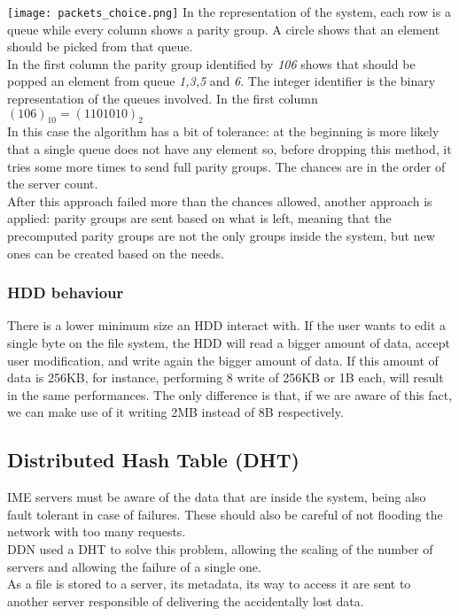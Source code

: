 \texttt{[image: packets\_choice.png]}
In the representation of the system, each row is a queue while every column shows a parity group.
A circle shows that an element should be picked from that queue. \\
In the first column the parity group identified by \textit{106} shows that
should be popped an element from queue \textit{1,3,5} and \textit{6}. The
integer identifier is the binary representation of the queues involved. In the
first column $(106)_{10} = (1101010)_2$ \\
In this case the algorithm has a bit of tolerance: at the beginning is more
likely that a single queue does not have any element so, before dropping this
method, it tries some more times to send full parity groups. The chances are in
the order of the server count. \\
After this approach failed more than the chances allowed, another approach is applied:
parity groups are sent based on what is left, meaning that the precomputed
parity groups are not the only groups inside the system, but new ones can be
created based on the needs.\\

\subsubsection*{HDD behaviour}\label{hdd-behaviour}
There is a lower minimum size an HDD interact with. If the user wants to edit a
single byte on the file system, the HDD will read a bigger amount of data,
accept user modification, and write again the bigger amount of data. If this
amount of data is 256KB, for instance, performing 8 write of 256KB or 1B each,
will result in the same performances.  The only difference is that, if we are
aware of this fact, we can make use of it writing 2MB instead of 8B
respectively.

\subsection{Distributed Hash Table (DHT)}
IME servers must be aware of the data that are inside the system, being also
fault tolerant in case of failures. These should also be careful of not flooding
the network with too many requests. \\
DDN used a DHT to solve this problem, allowing the scaling of the number of
servers and allowing the failure of a single one. \\
As a file is stored to a server, its metadata, its way to access it are sent to
another server responsible of delivering the accidentally lost data.

